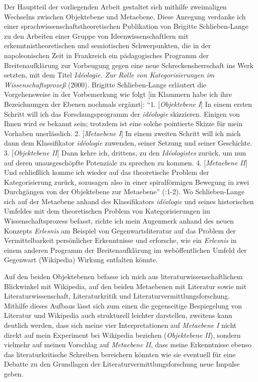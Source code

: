\documentclass[fontsize=12pt]{scrartcl}
\begin{document}
Der Hauptteil der vorliegenden Arbeit gestaltet sich mithilfe zweimaligen Wechselns zwischen Objektebene und Metaebene. Diese Anregung verdanke ich einer sprachwissenschaftstheo\-retischen Publikation von Brigitte Schlieben-Lange zu den Arbeiten einer Gruppe von Ideenwissenschaftlern\textsuperscript{\tiny *} mit erkenntnistheo\-retischen und se\-mio\-tischen Schwerpunkten, die in der napoleonischen Zeit in Frankreich ein p\"ada\-go\-gi\-sches Programm der Breitenaufkl\"arung zur Vorbeugung gegen eine neue Schre\-ckens\-herr\-schaft ins Werk setzten, mit dem Titel \textit{\flq Id\'{e}ologie\frq. Zur Rolle von Kategorisierungen im Wissenschaftsproze{\ss}} (2000). Brigitte Schlieben-Lange erl\"autert die Vorgehensweise in der Vorbemerkung wie folgt [in Klammern habe ich ihre Bezeichnungen der Ebenen nochmals erg\"anzt]: "`1. [\textit{Objektebene I}] In einem ersten Schritt will ich das For\-schungsprogramm der \textit{id\'{e}ologie} skizzieren. Einigen von Ihnen wird es bekannt sein; trotzdem ist eine solche pointierte Skizze f\"ur mein Vorhaben unerl\"asslich. 2. [\textit{Metaebene I}] In einem zweiten Schritt will ich mich dann dem Klassifikator \textit{id\'{e}ologie} zuwenden, seiner Setzung und seiner Geschichte. 3. [\textit{Objektebene II}] Dann kehre ich, drittens, zu den \textit{Id\'{e}ologistes} zur\"uck, um nun auf deren unausgesch\"opfte Potenziale zu sprechen zu kommen. 4. [\textit{Metaebene II}] Und schlie{\ss}lich komme ich wieder auf das theo\-retische Problem der Kategorisierung zur\"uck, sozusagen also in einer spiralf\"ormigen Bewegung in zwei Durchg\"angen von der Objektebene zur Metaebene"' (\cite{Schlieben-Lange2000}:1-2). Wo Schlieben-Lange sich auf der Metaebene anhand des Klassifikators \textit{id\'{e}ologie} und seines historischen Umfeldes mit dem theo\-retischen Problem von Kategorisierungen im Wissenschaftsprozess befasst, richte ich mein Augenmerk anhand des neuen Konzepts \textit{Erlesnis} am Beispiel von Gegenwartsli\-te\-ra\-tur auf das Problem der Vermittelbarkeit pers\"onlicher Erkenntnisse und erforsche, wie ein \textit{Erlesnis} in einem anderen Programm der Breitenaufkl\"arung im web\"of\-fent\-lichen Umfeld der Gegenwart (Wi\-ki\-pe\-dia) Wirkung entfalten k\"onnte. 

Auf den beiden Objektebenen befasse ich mich aus literaturwissenschaftlichem Blickwinkel mit Wikipedia, auf den beiden Metaebenen mit Literatur sowie mit Litera\-tur\-wis\-sen\-schaft, Literaturkritik und Literaturvermittlungsforschung. Mithilfe dieses Aufbaus l\"asst sich zum einen die gegenseitige Bespiegelung von Literatur und Wiki\-pe\-dia auch strukturell leichter darstellen, zweitens kann deutlich werden, dass sich meine vier Interpretationen auf \textit{Metaebene I} nicht direkt auf mein Experiment bei Wikipedia beziehen (\textit{Objektebene II}), sondern vielmehr auf meinen Vorschlag auf \textit{Metaebene II}, dass meine Erkenntnisse ebenso das literaturkritische Schreiben be\-rei\-chern k\"onn\-ten wie sie eventuell f\"ur eine Debatte zu den Grundlagen der Li\-te\-ra\-turvermittlungsforschung neue Impulse geben. 
\end{document}

